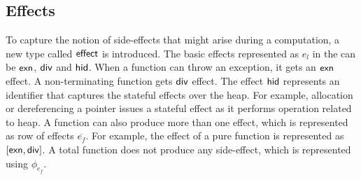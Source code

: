 \subsection{Effects}
To capture the notion of side-effects that might arise during a computation, a new type called ${\mathsf{effect}}$ is introduced. The basic effects represented as $e_l$ in the  can be ${\mathsf{exn}}$, ${\mathsf{div}}$ and ${\mathsf{hid}}$. When a function can throw an exception, it gets an ${\mathsf{exn}}$ effect. A non-terminating function gets ${\mathsf{div}}$ effect. The effect ${\mathsf{hid}}$ represents an identifier that captures the stateful effects over the heap. For example, allocation or dereferencing a pointer issues a stateful effect as it performs operation related to heap.
A function can also produce more than one effect, which is represented as row of effects $\overline{e_f}$. For example, the effect of a pure function is represented as $[{\mathsf{exn}}, {\mathsf{div}}]$. A total function does not produce any side-effect, which is represented using $\phi_{e_f}$. 
